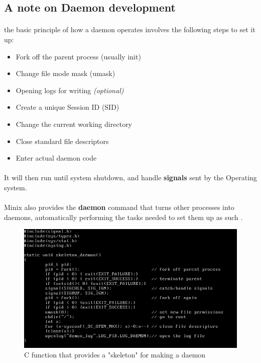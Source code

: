 \documentclass{article}
\begin{document}
    \subsection{A note on Daemon development}
        \paragraph{}the basic principle of how a daemon operates involves the following steps to set it up:
        \begin{itemize}
            \item Fork off the parent process (usually init)
            \item Change file mode mask (umask)
            \item Opening logs for writing \textit{(optional)}
            \item Create a unique Session ID (SID)
            \item Change the current working directory
            \item Close standard file descriptors
            \item Enter actual daemon code
        \end{itemize}
        \paragraph{}It will then run until system shutdown, and handle \textbf{signals} sent by the Operating system.
        \paragraph{}Minix also provides the \textbf{daemon} command that turns other processes into daemons, automatically performing the tasks needed to set them up as such \parencite{daemon_command_minix}.

        \begin{figure}[htbp]
            \centering
            \includegraphics[width=\textwidth]{daemon_code_screenshot_1.png}
            \caption{C function that provides a "skeleton" for making a daemon}
            \label{fig:my_label}
        \end{figure}
    
\end{document}
